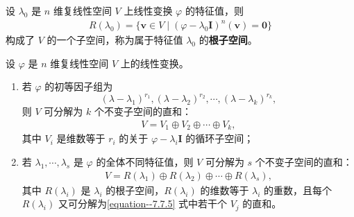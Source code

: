 \documentclass[../../main.tex]{subfiles}
\begin{document}
\begin{definition}[根子空间]
设 $\lambda_0$ 是 $n$ 维复线性空间 $V$ 上线性变换 $\varphi$ 的特征值，则
\begin{align*}
R(\lambda_0) = \{\boldsymbol{v} \in V \mid (\varphi - \lambda_0\boldsymbol{I})^n(\boldsymbol{v}) = \boldsymbol{0}\}
\end{align*}
构成了 $V$ 的一个子空间，称为属于特征值 $\lambda_0$ 的\textbf{根子空间}。 
\end{definition}

\begin{theorem}\label{theorem:Jordan标准型的几何意义}
设 $\varphi$ 是 $n$ 维复线性空间 $V$ 上的线性变换。
\begin{enumerate}[(1)]
\item 若 $\varphi$ 的初等因子组为
\[
(\lambda - \lambda_1)^{r_1}, (\lambda - \lambda_2)^{r_2}, \cdots, (\lambda - \lambda_k)^{r_k},
\]
则 $V$ 可分解为 $k$ 个不变子空间的直和：
\begin{align}
V = V_1 \oplus V_2 \oplus \cdots \oplus V_k, \label{equation--7.7.5}
\end{align}
其中 $V_i$ 是维数等于 $r_i$ 的关于 $\varphi - \lambda_i\boldsymbol{I}$ 的循环子空间；

\item 若 $\lambda_1, \cdots, \lambda_s$ 是 $\varphi$ 的全体不同特征值，则 $V$ 可分解为 $s$ 个不变子空间的直和：
\begin{align*}
V = R(\lambda_1) \oplus R(\lambda_2) \oplus \cdots \oplus R(\lambda_s), 
\end{align*}
其中 $R(\lambda_i)$ 是 $\lambda_i$ 的根子空间，$R(\lambda_i)$ 的维数等于 $\lambda_i$ 的重数，且每个 $R(\lambda_i)$ 又可分解为\eqref{equation--7.7.5} 式中若干个 $V_j$ 的直和。 
\end{enumerate} 
\end{theorem}
\end{document}
